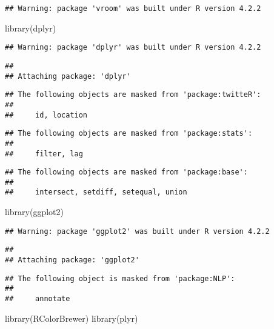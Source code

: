 \documentclass[
]{article}
\newenvironment{Shaded}{\begin{snugshade}}{\end{snugshade}}
\newcommand{\FunctionTok}[1]{\textcolor[rgb]{0.00,0.00,0.00}{#1}}
\newcommand{\NormalTok}[1]{#1}
\begin{document}
\begin{verbatim}
## Warning: package 'vroom' was built under R version 4.2.2
\end{verbatim}

\begin{Shaded}
\begin{Highlighting}[]
\FunctionTok{library}\NormalTok{(dplyr)}
\end{Highlighting}
\end{Shaded}

\begin{verbatim}
## Warning: package 'dplyr' was built under R version 4.2.2
\end{verbatim}

\begin{verbatim}
## 
## Attaching package: 'dplyr'
\end{verbatim}

\begin{verbatim}
## The following objects are masked from 'package:twitteR':
## 
##     id, location
\end{verbatim}

\begin{verbatim}
## The following objects are masked from 'package:stats':
## 
##     filter, lag
\end{verbatim}

\begin{verbatim}
## The following objects are masked from 'package:base':
## 
##     intersect, setdiff, setequal, union
\end{verbatim}

\begin{Shaded}
\begin{Highlighting}[]
\FunctionTok{library}\NormalTok{(ggplot2)}
\end{Highlighting}
\end{Shaded}

\begin{verbatim}
## Warning: package 'ggplot2' was built under R version 4.2.2
\end{verbatim}

\begin{verbatim}
## 
## Attaching package: 'ggplot2'
\end{verbatim}

\begin{verbatim}
## The following object is masked from 'package:NLP':
## 
##     annotate
\end{verbatim}

\begin{Shaded}
\begin{Highlighting}[]
\FunctionTok{library}\NormalTok{(RColorBrewer)}
\FunctionTok{library}\NormalTok{(plyr)}
\end{Highlighting}
\end{Shaded}
\end{document}
